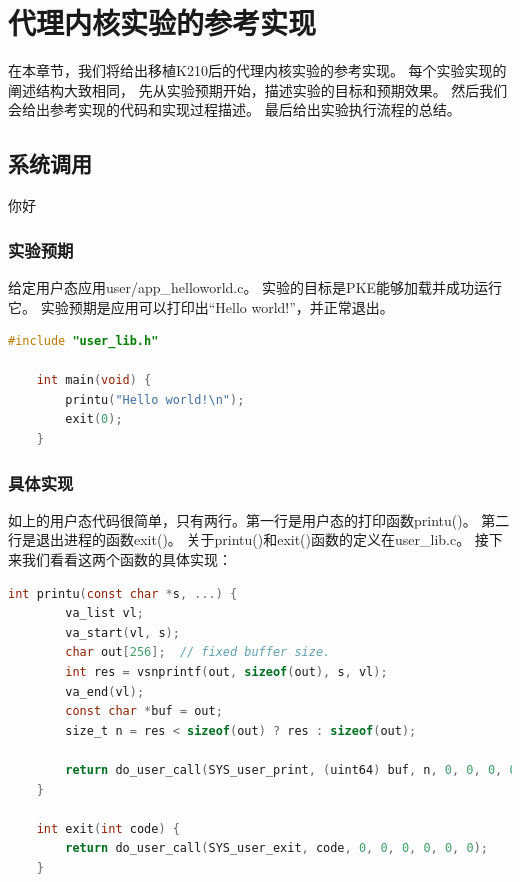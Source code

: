 \chapter{代理内核实验的参考实现}

在本章节，我们将给出移植K210后的代理内核实验的参考实现。
每个实验实现的阐述结构大致相同，
先从实验预期开始，描述实验的目标和预期效果。
然后我们会给出参考实现的代码和实现过程描述。
最后给出实验执行流程的总结。

\section{系统调用}
你好
\subsection{实验预期}

给定用户态应用user/app\_helloworld.c。
实验的目标是PKE能够加载并成功运行它。
实验预期是应用可以打印出“Hello world!”，并正常退出。

\begin{lstlisting}[caption={用户态应用app\_helloworld.c}, label={lst:app_helloworld}, language=C]
    #include "user_lib.h"

    int main(void) {
        printu("Hello world!\n");
        exit(0);
    }   
\end{lstlisting}

\subsection{具体实现}

如上的用户态代码很简单，只有两行。第一行是用户态的打印函数printu()。
第二行是退出进程的函数exit()。
关于printu()和exit()函数的定义在user\_lib.c。
接下来我们看看这两个函数的具体实现：

\begin{lstlisting}[caption={printu与exit的实现}, label={lst:printu_exit}, language=C]
    int printu(const char *s, ...) {
        va_list vl;
        va_start(vl, s);
        char out[256];  // fixed buffer size.
        int res = vsnprintf(out, sizeof(out), s, vl);
        va_end(vl);
        const char *buf = out;
        size_t n = res < sizeof(out) ? res : sizeof(out);

        return do_user_call(SYS_user_print, (uint64) buf, n, 0, 0, 0, 0, 0);
    }

    int exit(int code) {
        return do_user_call(SYS_user_exit, code, 0, 0, 0, 0, 0, 0);
    }   
\end{lstlisting}

